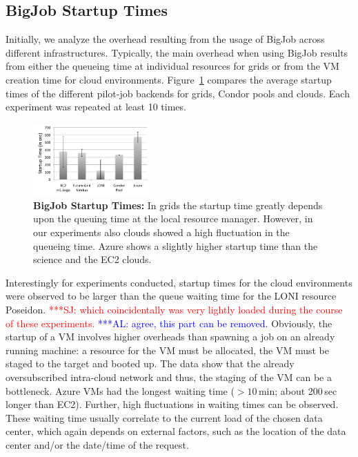 \documentclass[conference,final]{IEEEtran}
\newcommand{\up}{\vspace*{-1em}}
\newcommand{\alnote}[1]{ {\textcolor{blue} { ***AL: #1 }}}
\newcommand{\jhanote}[1]{ {\textcolor{red} { ***SJ: #1 }}}
\newcommand{\alnote}[1]{}
\newcommand{\jhanote}[1]{}
\begin{document}
\subsection{BigJob Startup Times}
\up Initially, we analyze the overhead resulting from the usage of
BigJob across different infrastructures. Typically, the main overhead
when using BigJob results from either the queueing time at individual
resources for grids or from the VM creation time for cloud
environments.  Figure~\ref{fig:performance_setup_time} compares the
average startup times of the different pilot-job backends for grids,
Condor pools and clouds. Each experiment was repeated at least 10
times.

\begin{figure}[htbp]
    \centering
        \includegraphics[width=0.4\textwidth]{performance/setup-times}
    \caption{\textbf{BigJob Startup Times:} In grids the startup time
      greatly depends upon the queuing time at the local resource
      manager. However, in our experiments also clouds showed a high
      fluctuation in the queueing time. Azure shows a slightly higher
      startup time than the science and the EC2 clouds.\up}
    \label{fig:performance_setup_time}
\end{figure}

Interestingly for experiments conducted,  startup times for the
cloud environments were observed to be larger than the queue waiting
time for the LONI resource Poseidon. \jhanote{which coincidentally was
  very lightly loaded during the course of these experiments.}
\alnote{agree, this part can be removed.}  Obviously, the startup of a
VM involves higher overheads than spawning a job on an already running
machine: a resource for the VM must be allocated, the VM must be
staged to the target and booted up. The data show that
the already oversubscribed intra-cloud network and thus, the staging
of the VM can be a bottleneck. Azure VMs had the longest waiting time
($>10$\,min; about 200\,sec longer than EC2).
Further, high fluctuations in waiting times can be observed. These
waiting time usually correlate to the current load of the chosen data
center, which again depends on external factors, such as the location
of the data center and/or the date/time of the request.
\end{document}
